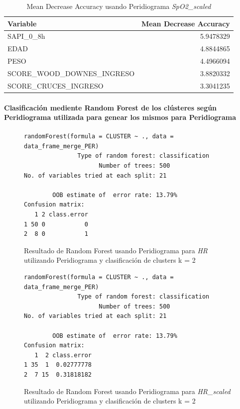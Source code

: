 \begin{table}[H]
    \centering
    \begin{tabular}{lr}
        \toprule
        \textbf{Variable} & \textbf{Mean Decrease Accuracy} \\
        \midrule
        SAPI\_0\_8h & 5.9478329 \\
        EDAD & 4.8844865 \\
        PESO & 4.4966094 \\
        SCORE\_WOOD\_DOWNES\_INGRESO & 3.8820332 \\
        SCORE\_CRUCES\_INGRESO & 3.3041235 \\
        \bottomrule
    \end{tabular}
    \caption{Mean Decrease Accuracy usando Peridiograma \textit{SpO2\_scaled}}
\end{table}


\paragraph{Clasificación mediente Random Forest de los clústeres según Peridiograma utilizada para genear los mismos para Peridiograma} 

\begin{figure}[H]
    \centering
    \begin{lstlisting}[frame=single, basicstyle=\small\ttfamily]
        randomForest(formula = CLUSTER ~ ., data = data_frame_merge_PER) 
               Type of random forest: classification
                     Number of trees: 500
No. of variables tried at each split: 21

        OOB estimate of  error rate: 13.79%
Confusion matrix:
   1 2 class.error
1 50 0           0
2  8 0           1
    \end{lstlisting}
    \caption{Resultado de Random Forest usando Peridiograma para \textit{HR} utilizando Peridiograma y clasificación de clusters k = 2}\label{fig:random_forest_per_result_RF_1}
\end{figure}
\begin{figure}[H]
    \centering
    \begin{lstlisting}[frame=single, basicstyle=\small\ttfamily]
        randomForest(formula = CLUSTER ~ ., data = data_frame_merge_PER) 
               Type of random forest: classification
                     Number of trees: 500
No. of variables tried at each split: 21

        OOB estimate of  error rate: 13.79%
Confusion matrix:
   1  2 class.error
1 35  1  0.02777778
2  7 15  0.31818182
    \end{lstlisting}
    \caption{Resultado de Random Forest usando Peridiograma para \textit{HR\_scaled} utilizando Peridiograma y clasificación de clusters k = 2}
    \label{fig:random_forest_per_result_RF_2}
\end{figure}

